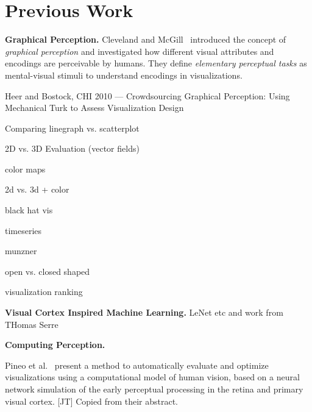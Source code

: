 \section{Previous Work}

\textbf{Graphical Perception.} Cleveland and McGill~\cite{cleveland_mcgill} introduced the concept of \emph{graphical perception} and investigated how different visual attributes and encodings are perceivable by humans. They define \emph{elementary perceptual tasks} as mental-visual stimuli to understand encodings in visualizations. 



\cite{HeerBostock2010} Heer and Bostock, CHI 2010 --- Crowdsourcing Graphical Perception: Using Mechanical Turk to Assess Visualization Design


\cite{Wang_linegraph_vs_scatterplot} Comparing linegraph vs. scatterplot


\cite{mckenzie_2d_3d} \cite{forsberg2009comparing_3d_vector} \cite{laidlaw_2d_vector} 2D vs. 3D Evaluation (vector fields)


\cite{kindlmann2002color} \cite{rheingans1992color} \cite{ware1988color} \cite{Rogowitz2001_colormaps} color maps

2d vs. 3d + color \cite{borkin2011arteries}

black hat vis \cite{heer2017blackhat}

timeseries \cite{herr2009timeseries}

munzner \cite{munzner2015visualization}

open vs. closed shaped \cite{open_vs_closed_shapes}

visualization ranking \cite{harrison2014_webers_law_rank}

\textbf{Visual Cortex Inspired Machine Learning.} LeNet etc and work from THomas Serre
%
%
%
%
%
%
%

\textbf{Computing Perception.}

Pineo et al.~\cite{Pineo2012_computational_perception} present a method to automatically evaluate and optimize visualizations using a computational model of human vision, based on a neural network simulation of the early perceptual processing in the retina and primary visual cortex. [JT] Copied from their abstract.

